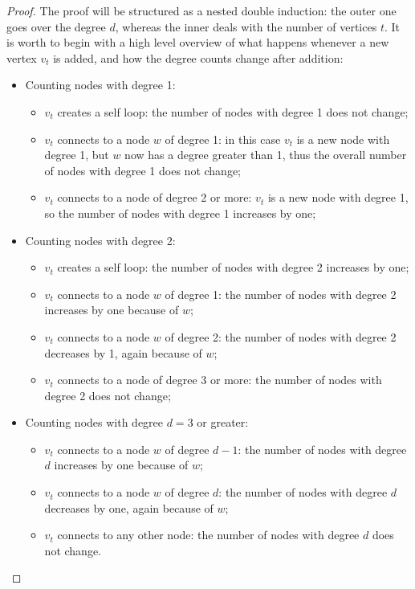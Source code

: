 \begin{proof}
    The proof will be structured as a nested double induction: the outer one goes over the degree $d$, whereas the inner deals with the number of vertices $t$. It is worth to begin with a high level overview of what happens whenever a new vertex $v_t$ is added, and how the degree counts change after addition:

    \begin{itemize}
        \item Counting nodes with degree 1:
            \begin{itemize}
                \item $v_t$ creates a self loop: the number of nodes with degree 1 does not change;
                \item $v_t$ connects to a node $w$ of degree 1: in this case $v_t$ is a new node with degree 1, but $w$ now has a degree greater than 1, thus the overall number of nodes with degree 1 does not change;
                \item $v_t$ connects to a node of degree 2 or more: $v_t$ is a new node with degree 1, so the number of nodes with degree 1 increases by one;
            \end{itemize}
        \item Counting nodes with degree 2:
            \begin{itemize}
                \item $v_t$ creates a self loop: the number of nodes with degree 2 increases by one;
                \item $v_t$ connects to a node $w$ of degree 1: the number of nodes with degree 2 increases by one because of $w$;
                \item $v_t$ connects to a node $w$ of degree 2: the number of nodes with degree 2 decreases by 1, again because of $w$;
                \item $v_t$ connects to a node of degree 3 or more: the number of nodes with degree 2 does not change;
            \end{itemize}
        \item Counting nodes with degree $d = 3$ or greater:
            \begin{itemize}
                \item $v_t$ connects to a node $w$ of degree $d - 1$: the number of nodes with degree $d$ increases by one because of $w$;
                \item $v_t$ connects to a node $w$ of degree $d$: the number of nodes with degree $d$ decreases by one, again because of $w$;
                \item $v_t$ connects to any other node: the number of nodes with degree $d$ does not change.
            \end{itemize}
    \end{itemize}


\end{proof}
